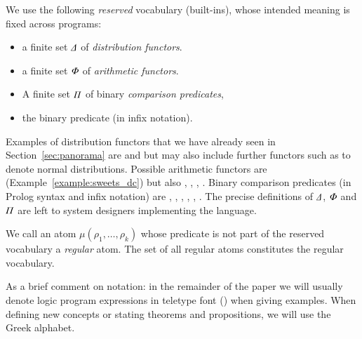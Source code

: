 \begin{definition}
    \label{def:reserved_vocabulary}
We use the following {\em reserved} vocabulary (built-ins), whose intended meaning is fixed across programs:
\begin{itemize}
    \item a finite set ${\Delta}$ of \emph{distribution functors}.
    \item a finite set ${\Phi}$ of \emph{arithmetic functors}.
    \item A finite set ${\Pi}$ of binary \emph{comparison predicates}, 
    \item the binary predicate  (in infix notation).
\end{itemize}
\end{definition}

Examples of distribution functors that we have already seen in Section~\ref{sec:panorama} are  and  but may also include further functors such as  to denote normal distributions. Possible arithmetic functors are  (\cf Example~\ref{example:sweets_dc}) but also , , , \etc.
Binary comparison predicates (in Prolog syntax and infix notation) are , , , , , .
The precise definitions of ${\Delta}$, ${\Phi}$ and ${\Pi}$ are left to system designers implementing the language.

\begin{definition} \label{def:regular_vocabulary}
    We call an atom $\mu(\rho_1, \dots, \rho_k)$ whose predicate  is not part of the reserved vocabulary a \emph{regular} atom. The set of all regular atoms constitutes the regular vocabulary. 
\end{definition}


As a  brief comment on notation: in the remainder of the paper we will usually denote logic program expressions in teletype font (\eg {}) when giving examples. When defining new concepts or stating theorems and propositions, we will use the Greek alphabet.



